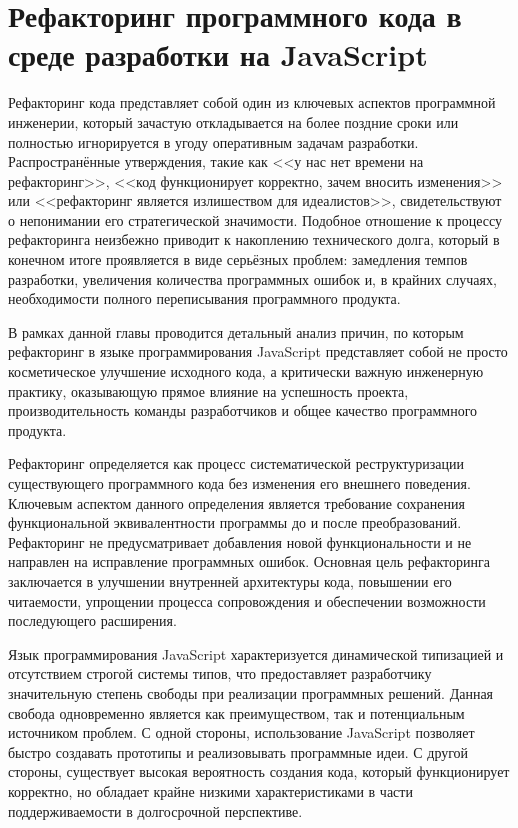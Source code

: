\section{Рефакторинг программного кода в среде разработки на JavaScript}
Рефакторинг кода представляет собой один из ключевых аспектов программной инженерии, который зачастую откладывается на более поздние сроки или полностью игнорируется в угоду оперативным задачам разработки. Распространённые утверждения, такие как <<у нас нет времени на рефакторинг>>, <<код функционирует корректно, зачем вносить изменения>> или <<рефакторинг является излишеством для идеалистов>>, свидетельствуют о непонимании его стратегической значимости. Подобное отношение к процессу рефакторинга неизбежно приводит к накоплению технического долга, который в конечном итоге проявляется в виде серьёзных проблем: замедления темпов разработки, увеличения количества программных ошибок и, в крайних случаях, необходимости полного переписывания программного продукта.

В рамках данной главы проводится детальный анализ причин, по которым рефакторинг в языке программирования JavaScript представляет собой не просто косметическое улучшение исходного кода, а критически важную инженерную практику, оказывающую прямое влияние на успешность проекта, производительность команды разработчиков и общее качество программного продукта.

Рефакторинг определяется как процесс систематической реструктуризации существующего программного кода без изменения его внешнего поведения. Ключевым аспектом данного определения является требование сохранения функциональной эквивалентности программы до и после преобразований. Рефакторинг не предусматривает добавления новой функциональности и не направлен на исправление программных ошибок. Основная цель рефакторинга заключается в улучшении внутренней архитектуры кода, повышении его читаемости, упрощении процесса сопровождения и обеспечении возможности последующего расширения.

Язык программирования JavaScript характеризуется динамической типизацией и отсутствием строгой системы типов, что предоставляет разработчику значительную степень свободы при реализации программных решений. Данная свобода одновременно является как преимуществом, так и потенциальным источником проблем. С одной стороны, использование JavaScript позволяет быстро создавать прототипы и реализовывать программные идеи. С другой стороны, существует высокая вероятность создания кода, который функционирует корректно, но обладает крайне низкими характеристиками в части поддерживаемости в долгосрочной перспективе.

